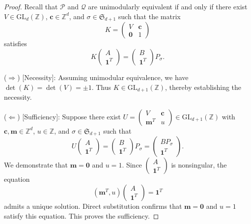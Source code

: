 \documentclass[reqno, 12pt]{article}
\theoremstyle{mydefinition}
\theoremstyle{myremark}
\numberwithin{algorithm}{section}
\begin{document}
\begin{proof}
Recall that $\mathcal{P}$ and $\mathcal{Q}$ are unimodularly equivalent if and only if
there exist $V \in \mathrm{GL}_d(\mathbb{Z})$, $\mathbf{c} \in \mathbb{Z}^d$, and $\sigma \in \mathfrak{S}_{d+1}$ such that
the matrix
\[
K = \begin{pmatrix}
V & \mathbf{c} \\
\mathbf{0} & 1
\end{pmatrix}
\]
satisfies
\[
K \begin{pmatrix}
A \\
\mathbf{1}^T
\end{pmatrix} = \begin{pmatrix}
B \\
\mathbf{1}^T
\end{pmatrix} P_\sigma.
\]

($\Rightarrow$) [Necessity]:
Assuming unimodular equivalence, we have $\det(K) = \det(V) = \pm 1$.
Thus $K \in \mathrm{GL}_{d+1}(\mathbb{Z})$, thereby establishing the necessity.

($\Leftarrow$) [Sufficiency]:
Suppose there exist
$U = \begin{pmatrix}
V & \mathbf{c} \\
\mathbf{m}^T & u
\end{pmatrix} \in \mathrm{GL}_{d+1}(\mathbb{Z})$
with $\mathbf{c}, \mathbf{m} \in \mathbb{Z}^d$, $u \in \mathbb{Z}$,
and $\sigma \in \mathfrak{S}_{d+1}$ such that
\[
U \begin{pmatrix}
A \\
\mathbf{1}^T
\end{pmatrix} = \begin{pmatrix}
B \\
\mathbf{1}^T
\end{pmatrix} P_\sigma=\begin{pmatrix}
B P_\sigma \\
\mathbf{1}^T
\end{pmatrix} .
\]
We demonstrate that $\mathbf{m} = \mathbf{0}$ and $u = 1$.
Since $\begin{pmatrix} A \\ \mathbf{1}^T \end{pmatrix}$ is nonsingular,
the equation
\[
(\mathbf{m}^T, u) \begin{pmatrix} A \\ \mathbf{1}^T \end{pmatrix} = \mathbf{1}^T
\]
admits a unique solution. Direct substitution confirms that
$\mathbf{m} = \mathbf{0}$ and $u = 1$ satisfy this equation.
This proves the sufficiency.
\end{proof}
\end{document}

